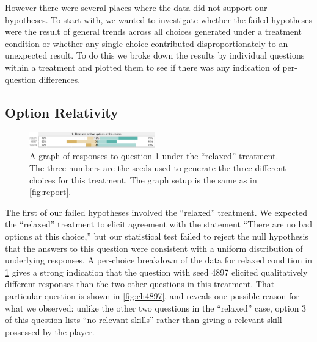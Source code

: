 However there were several places where the data did not support our hypotheses.
%
To start with, we wanted to investigate whether the failed hypotheses were the result of general trends across all choices generated under a treatment condition or whether any single choice contributed disproportionately to an unexpected result.
%
To do this we broke down the results by individual questions within a treatment and plotted them to see if there was any indication of per-question differences.


\subsection{Option Relativity}


\begin{figure}[h]
  \hspace*{-0.2em}\includegraphics[width=0.485\textwidth]{fig/relaxed-q1.pdf}
  \caption{A graph of responses to question 1 under the ``relaxed'' treatment. The three numbers are the seeds used to generate the three different choices for this treatment. The graph setup is the same as in \cref{fig:report}.}
  \label{fig:relaxedq1}
\end{figure}


The first of our failed hypotheses involved the ``relaxed'' treatment.
%
We expected the ``relaxed'' treatment to elicit agreement with the statement ``There are no bad options at this choice,'' but our statistical test failed to reject the null hypothesis that the answers to this question were consistent with a uniform distribution of underlying responses.
%
A per-choice breakdown of the data for relaxed condition in \cref{fig:relaxedq1} gives a strong indication that the question with seed 4897 elicited qualitatively different responses than the two other questions in this treatment.
%
That particular question is shown in \cref{fig:ch4897}, and reveals one possible reason for what we observed: unlike the other two questions in the ``relaxed'' case, option 3 of this question lists ``no relevant skills'' rather than giving a relevant skill possessed by the player.



